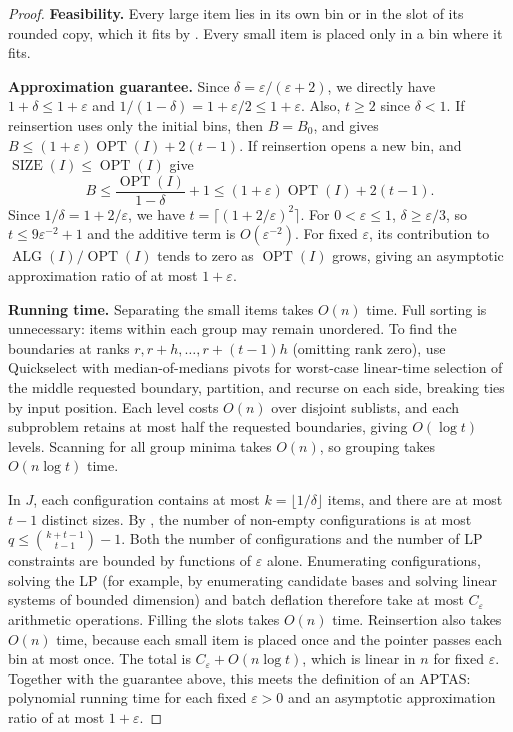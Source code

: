 \documentclass[11pt,a4paper,onecolumn]{article}
\theoremstyle{plain}
\theoremstyle{definition}
\theoremstyle{remark}
\DeclareMathOperator{\OPT}{OPT}
\DeclareMathOperator{\ALG}{ALG}
\DeclareMathOperator{\SIZE}{SIZE}
\begin{document}
\begin{proof}
\textbf{Feasibility.}
Every large item lies in its own bin or in the slot of its rounded
copy, which it fits by . Every small item is
placed only in a bin where it fits.

\smallskip\noindent\textbf{Approximation guarantee.}
Since $\delta=\varepsilon/(\varepsilon+2)$, we directly have
$1+\delta\le1+\varepsilon$ and
$1/(1-\delta)=1+\varepsilon/2\le1+\varepsilon$.
Also, $t\ge2$ since $\delta<1$.
If reinsertion uses only the initial bins, then $B=B_0$, and
 gives $B\le(1+\varepsilon)\OPT(I)+2(t-1)$.
If reinsertion opens a new bin,  and
$\SIZE(I)\le\OPT(I)$ give
\[
  B\le\frac{\OPT(I)}{1-\delta}+1\le(1+\varepsilon)\OPT(I)+2(t-1).
\]
Since $1/\delta=1+2/\varepsilon$, we have
$t=\lceil(1+2/\varepsilon)^2\rceil$. For $0<\varepsilon\le1$,
$\delta\ge\varepsilon/3$, so $t\le9\varepsilon^{-2}+1$ and the additive
term is $O(\varepsilon^{-2})$. For fixed $\varepsilon$, its
contribution to $\ALG(I)/\OPT(I)$ tends to zero as $\OPT(I)$ grows,
giving an asymptotic approximation ratio of at most $1+\varepsilon$.

\smallskip\noindent\textbf{Running time.}
Separating the small items takes $O(n)$ time. Full sorting is
unnecessary: items within each group may remain unordered. To find
the boundaries at ranks $r,r+h,\ldots,r+(t-1)h$ (omitting rank zero),
use Quickselect with median-of-medians pivots for worst-case
linear-time selection of the middle requested boundary, partition, and recurse on each side,
breaking ties by input position. Each level costs $O(n)$ over disjoint
sublists, and each subproblem retains at most half the requested
boundaries, giving $O(\log t)$ levels. Scanning for all group minima
takes $O(n)$, so grouping takes $O(n\log t)$ time.

In $J$, each configuration contains at most $k=\lfloor1/\delta\rfloor$
items, and there are at most $t-1$ distinct sizes. By
, the number of non-empty configurations is
at most $q\le\binom{k+t-1}{t-1}-1$. Both the number of configurations
and the number of LP constraints are bounded by functions of
$\varepsilon$ alone. Enumerating configurations,
solving the LP (for example, by enumerating candidate bases and solving
linear systems of bounded dimension) and batch deflation therefore take
at most $C_\varepsilon$ arithmetic operations. Filling the slots takes
$O(n)$ time. Reinsertion also takes $O(n)$ time, because each small
item is placed once and the pointer passes each bin at most once. The
total is $C_\varepsilon+O(n\log t)$, which is linear in $n$ for fixed
$\varepsilon$. Together with the guarantee above, this meets the
definition of an APTAS: polynomial running time for each fixed
$\varepsilon>0$ and an asymptotic approximation ratio of at most
$1+\varepsilon$.
\end{proof}
\end{document}
